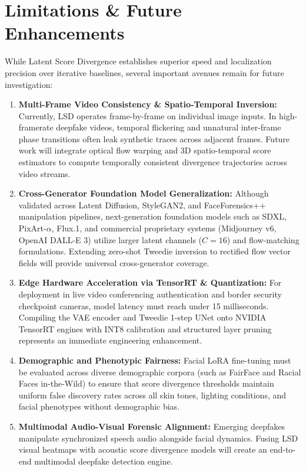 \documentclass[12pt,a4paper]{report}
\begin{document}
\section{Limitations \& Future Enhancements}
While Latent Score Divergence establishes superior speed and localization precision over iterative baselines, several important avenues remain for future investigation:
\begin{enumerate}
    \item \textbf{Multi-Frame Video Consistency \& Spatio-Temporal Inversion:} Currently, LSD operates frame-by-frame on individual image inputs. In high-framerate deepfake videos, temporal flickering and unnatural inter-frame phase transitions often leak synthetic traces across adjacent frames. Future work will integrate optical flow warping and 3D spatio-temporal score estimators to compute temporally consistent divergence trajectories across video streams.
    \item \textbf{Cross-Generator Foundation Model Generalization:} Although validated across Latent Diffusion, StyleGAN2, and FaceForensics++ manipulation pipelines, next-generation foundation models such as SDXL, PixArt-$\alpha$, Flux.1, and commercial proprietary systems (Midjourney v6, OpenAI DALL-E 3) utilize larger latent channels ($C=16$) and flow-matching formulations. Extending zero-shot Tweedie inversion to rectified flow vector fields will provide universal cross-generator coverage.
    \item \textbf{Edge Hardware Acceleration via TensorRT \& Quantization:} For deployment in live video conferencing authentication and border security checkpoint cameras, model latency must reach under 15 milliseconds. Compiling the VAE encoder and Tweedie 1-step UNet onto NVIDIA TensorRT engines with INT8 calibration and structured layer pruning represents an immediate engineering enhancement.
    \item \textbf{Demographic and Phenotypic Fairness:} Facial LoRA fine-tuning must be evaluated across diverse demographic corpora (such as FairFace and Racial Faces in-the-Wild) to ensure that score divergence thresholds maintain uniform false discovery rates across all skin tones, lighting conditions, and facial phenotypes without demographic bias.
    \item \textbf{Multimodal Audio-Visual Forensic Alignment:} Emerging deepfakes manipulate synchronized speech audio alongside facial dynamics. Fusing LSD visual heatmaps with acoustic score divergence models will create an end-to-end multimodal deepfake detection engine.
\end{enumerate}

\clearpage



\end{document}
